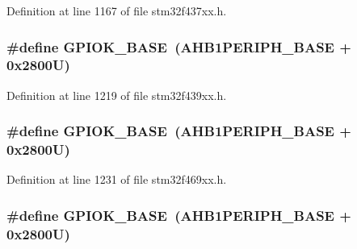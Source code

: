 Definition at line 1167 of file stm32f437xx.\+h.

\subsubsection[{\texorpdfstring{G\+P\+I\+O\+K\+\_\+\+B\+A\+SE}{GPIOK_BASE}}]{\setlength{\rightskip}{0pt plus 5cm}\#define G\+P\+I\+O\+K\+\_\+\+B\+A\+SE~({\bf A\+H\+B1\+P\+E\+R\+I\+P\+H\+\_\+\+B\+A\+SE} + 0x2800\+U)}\hypertarget{group___peripheral__memory__map_ga46d3f8cd7c045b5e13cd7395b8e936e5}{}\label{group___peripheral__memory__map_ga46d3f8cd7c045b5e13cd7395b8e936e5}


Definition at line 1219 of file stm32f439xx.\+h.

\subsubsection[{\texorpdfstring{G\+P\+I\+O\+K\+\_\+\+B\+A\+SE}{GPIOK_BASE}}]{\setlength{\rightskip}{0pt plus 5cm}\#define G\+P\+I\+O\+K\+\_\+\+B\+A\+SE~({\bf A\+H\+B1\+P\+E\+R\+I\+P\+H\+\_\+\+B\+A\+SE} + 0x2800\+U)}\hypertarget{group___peripheral__memory__map_ga46d3f8cd7c045b5e13cd7395b8e936e5}{}\label{group___peripheral__memory__map_ga46d3f8cd7c045b5e13cd7395b8e936e5}


Definition at line 1231 of file stm32f469xx.\+h.

\subsubsection[{\texorpdfstring{G\+P\+I\+O\+K\+\_\+\+B\+A\+SE}{GPIOK_BASE}}]{\setlength{\rightskip}{0pt plus 5cm}\#define G\+P\+I\+O\+K\+\_\+\+B\+A\+SE~({\bf A\+H\+B1\+P\+E\+R\+I\+P\+H\+\_\+\+B\+A\+SE} + 0x2800\+U)}\hypertarget{group___peripheral__memory__map_ga46d3f8cd7c045b5e13cd7395b8e936e5}{}\label{group___peripheral__memory__map_ga46d3f8cd7c045b5e13cd7395b8e936e5}


